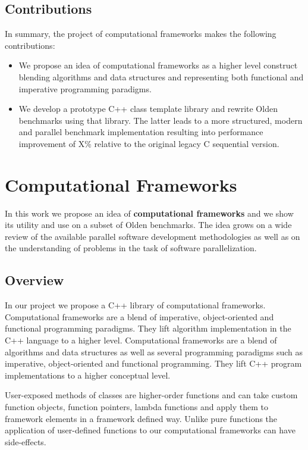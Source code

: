 \subsection{Contributions}
\quad In summary, the project of computational frameworks makes the following contributions:
%
\begin{itemize}
\renewcommand\labelitemi{$\vartriangleright$}
\renewcommand\labelitemii{$\bullet$}
\item We propose an idea of computational frameworks as a higher level construct blending algorithms and data structures and representing both functional and imperative programming paradigms.
\item We develop a prototype C++ class template library and rewrite Olden benchmarks using that library. The latter leads to a more structured, modern and parallel benchmark implementation resulting into performance improvement of X\% relative to the original legacy C sequential version.   
\end{itemize}

\section{Computational Frameworks}
\quad In this work we propose an idea of \textbf{computational frameworks} and we show its utility and use on a subset of Olden benchmarks. The idea grows on a wide review of the available parallel software development methodologies as well as on the understanding of problems in the task of software parallelization.  

\subsection{Overview}
\quad In our project we propose a C++ library of computational frameworks. Computational frameworks are a blend of imperative, object-oriented and functional programming paradigms. They lift algorithm implementation in the C++ language to a higher level.
Computational frameworks are a blend of algorithms and data structures as well as several programming paradigms such as imperative, object-oriented and functional programming. They lift C++ program implementations to a higher conceptual level. 

User-exposed methods of classes are higher-order functions and can take custom function objects, function pointers, lambda functions and apply them to framework elements in a framework defined way. Unlike pure functions the application of user-defined functions to our computational frameworks can have side-effects.

